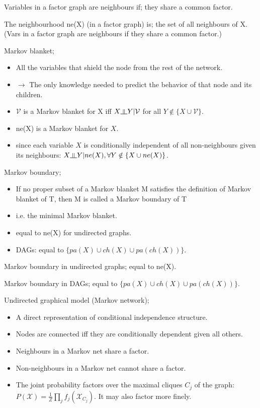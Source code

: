 \documentclass{article}
\newcommand{\indep}{\rotatebox[origin=c]{90}{$\models$}}
\begin{document}
Variables in a factor graph are neighbours if; they share a common factor. 

The neighbourhood ne(X) (in a factor graph) is;  the set of all neighbours of X. (Vars in a factor graph are neighbours if they share a common factor.)

Markov blanket; \begin{itemize} \item All the variables that shield the node from the rest of the network.  \item $\to$ The only knowledge needed to predict the behavior of that node and its children.  \item $\mathcal{V}$ is a Markov blanket for X iff $X \indep Y |\mathcal{V}$ for all $Y \notin \{X\cup \mathcal{V} \}$.  \item ne(X) is  a Markov blanket for $X$.  \item since each variable $X$ is conditionally independent of all non-neighbours given its neighbours: $X\indep Y|ne(X), \forall Y \notin \{X\cup ne(X) \}$.  \end{itemize}

Markov boundary; \begin{itemize} \item If no proper subset of a Markov blanket M satisfies the definition of Markov blanket of T, then M is called a Markov boundary of T \item i.e. the minimal Markov blanket.  \item equal to ne(X) for undirected graphs.  \item DAGs: equal to $\{pa(X)\cup ch(X) \cup pa(ch(X)) \}$.  \end{itemize}

Markov boundary in undirected graphs; equal to ne(X).

Markov boundary in DAGs; equal to $\{pa(X)\cup ch(X) \cup pa(ch(X)) \}$.

Undirected graphical model (Markov network); \begin{itemize} \item A direct representation of conditional independence structure.  \item Nodes are connected iff they are conditionally dependent given all others.  \item Neighbours in a Markov net share a factor.  \item Non-neighbours in a Markov net cannot share a factor.  \item The joint probability factors over the maximal cliques $C_j$ of the graph: $P(\mathcal{X})=\frac{1}{Z}\prod_j f_j(\mathcal{X}_{C_j})$. It may also factor more finely.  \end{itemize}
\end{document}
